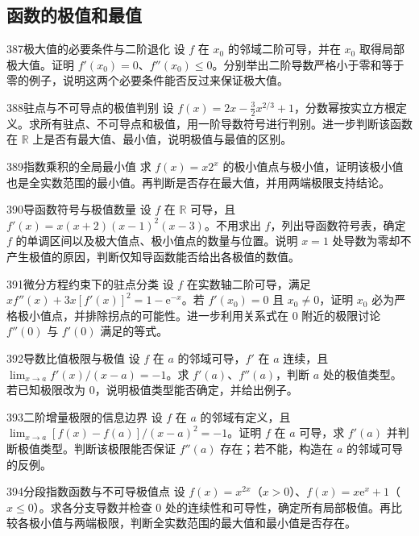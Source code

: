 \subsection{函数的极值和最值}
\begin{exercise}{387}{极大值的必要条件与二阶退化}
设 $f$ 在 $x_0$ 的邻域二阶可导，并在 $x_0$ 取得局部极大值。证明 $f'(x_0)=0$、$f''(x_0)\le0$。分别举出二阶导数严格小于零和等于零的例子，说明这两个必要条件能否反过来保证极大值。
\end{exercise}
\begin{exercise}{388}{驻点与不可导点的极值判别}
设 $f(x)=2x-\tfrac32x^{2/3}+1$，分数幂按实立方根定义。求所有驻点、不可导点和极值，用一阶导数符号进行判别。进一步判断该函数在 $\mathbb R$ 上是否有最大值、最小值，说明极值与最值的区别。
\end{exercise}
\begin{exercise}{389}{指数乘积的全局最小值}
求 $f(x)=x2^x$ 的极小值点与极小值，证明该极小值也是全实数范围的最小值。再判断是否存在最大值，并用两端极限支持结论。
\end{exercise}
\begin{exercise}{390}{导函数符号与极值数量}
设 $f$ 在 $\mathbb R$ 可导，且 $f'(x)=x(x+2)(x-1)^2(x-3)$。不用求出 $f$，列出导函数符号表，确定 $f$ 的单调区间以及极大值点、极小值点的数量与位置。说明 $x=1$ 处导数为零却不产生极值的原因，判断仅知导函数能否给出各极值的数值。
\end{exercise}
\begin{exercise}{391}{微分方程约束下的驻点分类}
设 $f$ 在实数轴二阶可导，满足 $xf''(x)+3x[f'(x)]^2=1-\mathrm e^{-x}$。若 $f'(x_0)=0$ 且 $x_0\ne0$，证明 $x_0$ 必为严格极小值点，并排除拐点的可能性。进一步利用关系式在 $0$ 附近的极限讨论 $f''(0)$ 与 $f'(0)$ 满足的等式。
\end{exercise}
\begin{exercise}{392}{导数比值极限与极值}
设 $f$ 在 $a$ 的邻域可导，$f'$ 在 $a$ 连续，且 $\lim_{x\to a}f'(x)/(x-a)=-1$。求 $f'(a)$、$f''(a)$，判断 $a$ 处的极值类型。若已知极限改为 $0$，说明极值类型能否确定，并给出例子。
\end{exercise}
\begin{exercise}{393}{二阶增量极限的信息边界}
设 $f$ 在 $a$ 的邻域有定义，且 $\lim_{x\to a}[f(x)-f(a)]/(x-a)^2=-1$。证明 $f$ 在 $a$ 可导，求 $f'(a)$ 并判断极值类型。判断该极限能否保证 $f''(a)$ 存在；若不能，构造在 $a$ 的邻域可导的反例。
\end{exercise}
\begin{exercise}{394}{分段指数函数与不可导极值点}
设 $f(x)=x^{2x}$（$x>0$）、$f(x)=x\mathrm e^x+1$（$x\le0$）。求各分支导数并检查 $0$ 处的连续性和可导性，确定所有局部极值。再比较各极小值与两端极限，判断全实数范围的最大值和最小值是否存在。
\end{exercise}
